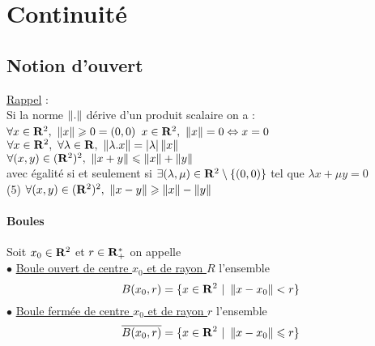

\minitoc
	\section{Continuité}
	\subsection{Notion d'ouvert}
		\uline{Rappel} : \\
		Si la norme $\left\Vert . \right\Vert$ dérive d'un produit scalaire on a :\\
		\un $\forall x\in {\mathbf{R}}^2 ,~\left\Vert x \right\Vert\geqslant 0=(0,0)$ \hfill \deux $x\in {\mathbf{R}}^2 ,~\left\Vert x \right\Vert = 0 \Leftrightarrow x=0$ \hfill ${}$ \\
		\trois $\forall x\in {\mathbf{R}}^2 ,~\forall \lambda\in{\mathbf{R}},~ \left\Vert \lambda.x \right\Vert=\left\vert \lambda \right\vert\left\Vert x \right\Vert$\\
		\quatre $\forall (x,y) \in ({\mathbf{R}}^2)^2,~ \left\Vert x+y \right\Vert\leqslant\left\Vert x \right\Vert+\left\Vert y \right\Vert$ \\ \hspace*{0.5cm} avec égalité si et seulement si $\exists (\lambda,\mu)\in {\mathbf{R}}^2\setminus\{(0,0)\}$ tel que $\lambda x +\mu y = 0$\\
		{\scriptsize (5)} $\forall (x,y)\in ({\mathbf{R}}^2)^2 ,~\left\Vert x-y \right\Vert \geqslant \left\Vert x \right\Vert - \left\Vert y \right\Vert$
		\vspace*{0.5cm} \\  \newpage \traitd
		\paragraph{Boules}
			Soit $x_0\in{\mathbf{R}}^2$ et $r\in{\mathbf{R}}_+^*$ on appelle \\
			\hspace*{2cm} $\bullet$ \uline{Boule ouvert de centre $x_0$ et de rayon $R$} l'ensemble \[ B(x_0,r) = \{ x\in{\mathbf{R}}^2 ~|~\left\Vert x-x_0 \right\Vert < r\} \]
			\hspace*{2cm} $\bullet$ \uline{Boule fermée de centre $x_0$ et de rayon $r$} l'ensemble \[ \overline{B(x_0,r)} = \{ x\in{\mathbf{R}}^2 ~|~\left\Vert x-x_0 \right\Vert \leqslant r\}\]
			\trait ${}$ \vspace*{-1.2cm} \traitd
